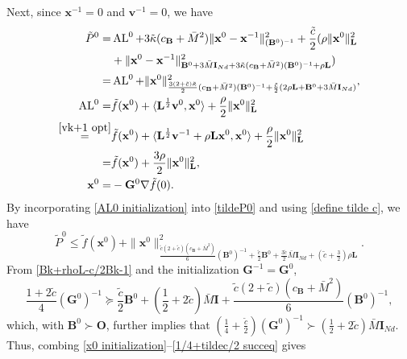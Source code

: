 \documentclass[12pt,draftcls,onecolumn]{IEEEtran}
\begin{document}
Next, since $\mathbf{x}^{-1}=0$ and $\mathbf{v}^{-1}=0$, we have
\begin{align}
	\tilde{P}^0 =& \operatorname{AL}^0+3\tilde{\kappa}(c_{\mathbf{B}}+\bar{M}^2)\|\mathbf{x}^0-\mathbf{x}^{-1}\|^2_{(\mathbf{B}^{0})^{-1}}+\frac{\tilde{c}}{2}(\rho \|\mathbf{x}^0\|^2_\mathbf{L}\notag\\
    &+\|\mathbf{x}^0-\mathbf{x}^{-1}\|^2_{\mathbf{B}^{0}+3\bar{M}\mathbf{I}_{Nd}+3\tilde{\kappa}(c_{\mathbf{B}}+\bar{M}^2)(\mathbf{B}^{0})^{-1}+\rho \mathbf{L}})\notag\\
	=& \operatorname{AL}^0+\|\mathbf{x}^0\|^2_{\frac{3(2+\tilde{c})\tilde{\kappa}}{2}(c_{\mathbf{B}}+\bar{M}^2)(\mathbf{B}^{0})^{-1}+\frac{\tilde{c}}{2}(2\rho \mathbf{L} +\mathbf{B}^0+3\bar{M}\mathbf{I}_{Nd})}, \label{tildeP0} \\
	\operatorname{AL}^0=&\tilde{f}(\mathbf{x}^0)+\langle \mathbf{L}^{\frac{1}{2}}\mathbf{v}^0,\mathbf{x}^0\rangle+\frac{\rho}{2}\|\mathbf{x}^0\|^2_\mathbf{L} \notag\\
	\overset{\eqref{vk+1 opt}}{=}& \tilde{f}(\mathbf{x}^0)+\langle \mathbf{L}^{\frac{1}{2}}\mathbf{v}^{-1}+\rho \mathbf{L} \mathbf{x}^0,\mathbf{x}^0\rangle +\frac{\rho}{2}\|\mathbf{x}^0\|^2_\mathbf{L}\notag\\
	=& \tilde{f}(\mathbf{x}^0)+\frac{3\rho}{2}\|\mathbf{x}^0\|^2_\mathbf{L}, \label{AL0 initialization}\\
	\mathbf{x}^0 =& -\mathbf{G}^0\nabla \tilde{f}(0) . \label{x0 initialization}
\end{align}
By incorporating \eqref{AL0 initialization} into \eqref{tildeP0} and using \eqref{define tilde c}, we have
\begin{equation}
	\tilde{P}^0\leq \tilde{f}(\mathbf{x}^0)+\|\mathbf{x}^0\|^2_{\frac{\tilde{c}(2+\tilde{c})(c_{\mathbf{B}}+\bar{M}^2)}{6}(\mathbf{B}^0)^{-1}+\frac{\tilde{c}}{2}\mathbf{B}^0+\frac{3\tilde{c}}{2}\bar{M}\mathbf{I}_{Nd}+(\tilde{c}+\frac{3}{2})\rho \mathbf{L}}. \label{tildeP0 first}
\end{equation}
From \eqref{Bk+rhoL-c/2Bk-1} and the initialization $\mathbf{G}^{-1}=\mathbf{G}^0$, 
\begin{equation}
	\frac{1+2\tilde{c}}{4}(\mathbf{G}^0)^{-1} \succeq \frac{\tilde{c}}{2}\mathbf{B}^0+(\frac{1}{2}+2\tilde{c})\bar{M}\mathbf{I}+\frac{\tilde{c}(2+\tilde{c})(c_{\mathbf{B}}+\bar{M}^2)}{6}(\mathbf{B}^0)^{-1}, \label{1/4+tildec/2 succeq}
\end{equation}
which, with $\mathbf{B}^0\succ \mathbf{O}$, further implies that $(\frac{1}{4}+\frac{\tilde{c}}{2})(\mathbf{G}^0)^{-1}\succ (\frac{1}{2}+2\tilde{c})\bar{M}\mathbf{I}_{Nd}$. Thus, combing \eqref{x0 initialization}--\eqref{1/4+tildec/2 succeq} gives
\end{document}
